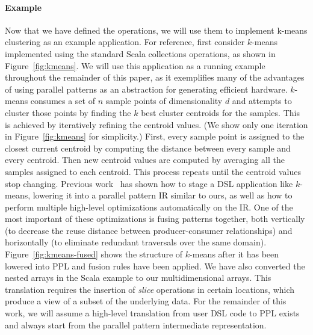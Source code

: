 \paragraph{Example}
Now that we have defined the operations, we will use them to implement k-means clustering as an example application.
For reference, first consider $k$-means implemented using the standard Scala collections operations, as shown in Figure~\ref{fig:kmeans}.
We will use this application as a running example throughout the remainder of this paper, as it exemplifies many of the advantages of using parallel patterns as an abstraction for generating efficient hardware.
$k$-means consumes a set of $n$ sample points of dimensionality $d$ and attempts to cluster those points by finding the $k$ best cluster centroids for the samples.
This is achieved by iteratively refining the centroid values.
(We show only one iteration in Figure~\ref{fig:kmeans} for simplicity.)
First, every sample point is assigned to the closest current centroid by computing the distance between every sample and every centroid.
Then new centroid values are computed by averaging all the samples assigned to each centroid.
This process repeats until the centroid values stop changing.
Previous work~\cite{rompf12optimizing,brown16clusters,chambers10flumejava} has shown how to stage a DSL application like $k$-means, lowering it into a parallel pattern IR similar to ours, as well as how to perform multiple high-level optimizations automatically on the IR.
One of the most important of these optimizations is fusing patterns together, both vertically (to decrease the reuse distance between producer-consumer relationships) and horizontally (to eliminate redundant traversals over the same domain).
Figure~\ref{fig:kmeans-fused} shows the structure of $k$-means after it has been lowered into PPL and fusion rules have been applied.
We have also converted the nested arrays in the Scala example to our multidimensional arrays.
This translation requires the insertion of \emph{slice} operations in certain locations, which produce a view of a subset of the underlying data.
For the remainder of this work, we will assume a high-level translation from user DSL code to PPL exists and always start from the parallel pattern intermediate representation.
